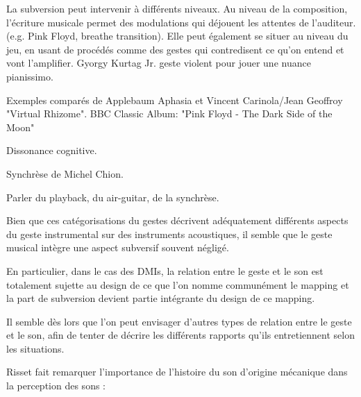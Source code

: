 La subversion peut intervenir à différents niveaux. Au niveau de la composition, l'écriture musicale permet des modulations qui déjouent les attentes de l'auditeur. (e.g. Pink Floyd, breathe transition). Elle peut également se situer au niveau du jeu, en usant de procédés comme des gestes qui contredisent ce qu'on entend et vont l'amplifier. Gyorgy Kurtag Jr. geste violent pour jouer une nuance pianissimo.

Exemples comparés de Applebaum Aphasia et Vincent Carinola/Jean Geoffroy "Virtual Rhizome".
BBC Classic Album: "Pink Floyd - The Dark Side of the Moon"

Dissonance cognitive.

Synchrèse de Michel Chion.

Parler du playback, du air-guitar, de la synchrèse.



Bien que ces catégorisations du gestes décrivent adéquatement différents aspects du geste instrumental sur des instruments acoustiques, il semble que le geste musical intègre une aspect subversif souvent négligé.

En particulier, dans le cas des \glspl{DMI}, la relation entre le geste et le son est totalement sujette au design de ce que l'on nomme communément le \gls{mapping} et la part de subversion devient partie intégrante du design de ce mapping. 


Il semble dès lors que l'on peut envisager d'autres types de relation entre le geste et le son, afin de tenter de décrire les différents rapports qu'ils entretiennent selon les situations.

Risset fait remarquer l'importance de l'histoire du son d'origine mécanique dans la perception des sons \cite{risset_son_1992}: 

